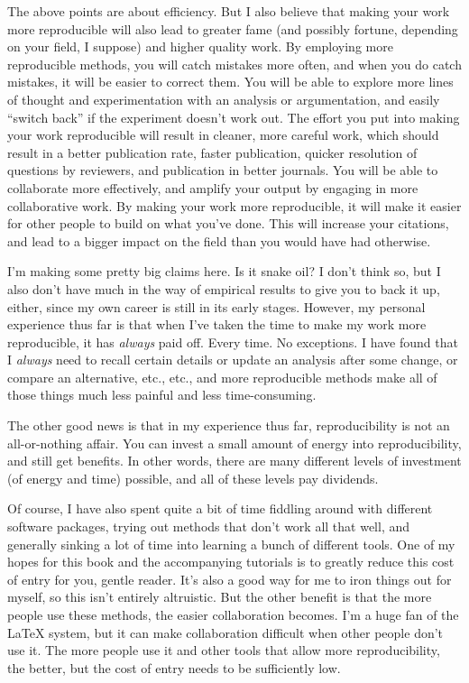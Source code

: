 \documentclass{book}
\begin{document}
The above points are about efficiency. But I also believe that making your work more reproducible will also lead to greater fame (and possibly fortune, depending on your field, I suppose) and higher quality work.  By employing more reproducible methods, you will catch mistakes more often, and when you do catch mistakes, it will be easier to correct them. You will be able to explore more lines of thought and experimentation with an analysis or argumentation, and easily ``switch back'' if the experiment doesn't work out. The effort you put into making your work reproducible will result in cleaner, more careful work, which should result in a better publication rate, faster publication, quicker resolution of questions by reviewers, and publication in better journals. You will be able to collaborate more effectively, and amplify your output by engaging in more collaborative work.  By making your work more reproducible, it will make it easier for other people to build on what you've done. This will increase your citations, and lead to a bigger impact on the field than you would have had otherwise.

I'm making some pretty big claims here.  Is it snake oil?  I don't think so, but I also don't have much in the way of empirical results to give you to back it up, either, since my own career is still in its early stages. However, my personal experience thus far is that when I've taken the time to make my work more reproducible, it has \emph{always} paid off.  Every time.  No exceptions.  I have found that I \emph{always} need to recall certain details or update an analysis after some change, or compare an alternative, etc., etc., and more reproducible methods make all of those things much less painful and less time-consuming.

The other good news is that in my experience thus far, reproducibility is not an all-or-nothing affair. You can invest a small amount of energy into reproducibility, and still get benefits. In other words, there are many different levels of investment (of energy and time) possible, and all of these levels pay dividends.

Of course, I have also spent quite a bit of time fiddling around with different software packages, trying out methods that don't work all that well, and generally sinking a lot of time into learning a bunch of different tools.  One of my hopes for this book and the accompanying tutorials is to greatly reduce this cost of entry for you, gentle reader.  It's also a good way for me to iron things out for myself, so this isn't entirely altruistic. But the other benefit is that the more people use these methods, the easier collaboration becomes.  I'm a huge fan of the \LaTeX{} system, but it can make collaboration difficult when other people don't use it.  The more people use it and other tools that allow more reproducibility, the better, but the cost of entry needs to be sufficiently low.
\end{document}
